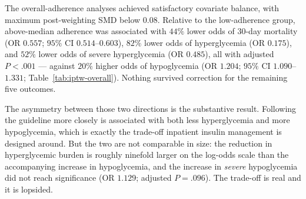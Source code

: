 The overall-adherence analyses achieved satisfactory covariate balance, with maximum post-weighting SMD below $0.08$. Relative to the low-adherence group, above-median adherence was associated with $44\%$ lower odds of $30$-day mortality (OR $0.557$; $95\%$ CI $0.514$--$0.603$), $82\%$ lower odds of hyperglycemia (OR $0.175$), and $52\%$ lower odds of severe hyperglycemia (OR $0.485$), all with adjusted $P<.001$ --- against $20\%$ higher odds of hypoglycemia (OR $1.204$; $95\%$ CI $1.090$--$1.331$; Table~\ref{tab:iptw-overall}). Nothing survived correction for the remaining five outcomes.

The asymmetry between those two directions is the substantive result. Following the guideline more closely is associated with both less hyperglycemia and more hypoglycemia, which is exactly the trade-off inpatient insulin management is designed around. But the two are not comparable in size: the reduction in hyperglycemic burden is roughly ninefold larger on the log-odds scale than the accompanying increase in hypoglycemia, and the increase in \emph{severe} hypoglycemia did not reach significance (OR $1.129$; adjusted $P=.096$). The trade-off is real and it is lopsided.

